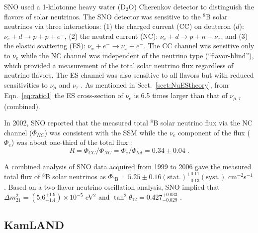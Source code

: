 SNO used a 1-kilotonne heavy water (D$_2$O) Cherenkov detector to distinguish the flavors of solar neutrinos. The SNO detector was sensitive to the $^8$B solar neutrinos via three interactions: (1) the charged current (CC) on deuteron ($d$): $\nu_e+d\to p+p+e^-$, (2) the neutral current (NC): $\nu_x+d\to p+n+\nu_x$, and (3) the elastic scattering (ES): $\nu_x+e^-\to \nu_x+e^-$. The CC channel was sensitive only to $\nu_e$ while the NC channel was independent of the neutrino type (``flavor-blind''), which provided a measurement of the total solar neutrino flux regardless of neutrino flavors. The ES channel was also sensitive to all flavors but with reduced sensitivities to $\nu_\mu$ and $\nu_\tau$ \cite{ahmad2002direct}. As mentioned in Sect.~\ref{sect:NuEStheory}, from Eqn.~\ref{eq:ratio1} the ES cross-section of $\nu_e$ is 6.5 times larger than that of $\nu_{\mu,\tau}$ (combined). 

In 2002, SNO reported that the measured total $^8$B solar neutrino flux via the NC channel ($\Phi_{NC}$) was consistent with the SSM while the $\nu_e$
component of the flux ($\Phi_e$) was about one-third of the total flux \cite{ahmad2002direct}:
\begin{equation}
R = \Phi_{CC}/\Phi_{NC} = \Phi_e/\Phi_{tot}=0.34\pm 0.04 \; .
\end{equation}

A combined analysis of SNO data acquired from 1999 to 2006 gave the measured total flux of $^8$B solar neutrinos as $\Phi_{^8\mathrm{B}}=5.25\pm0.16\mathrm{(stat.)}^{+0.11}_{-0.13}\mathrm{(syst.)}$ cm$^{-2}$s$^{-1}$. Based on a two-flavor neutrino oscillation analysis, SNO implied that $\Delta m^2_{21}=(5.6^{+1.9}_{-1.4})\times 10^{-5}$ eV$^2$ and $\tan^2\theta_{12}=0.427^{+0.033}_{-0.029}$ \cite{aharmim2013combined}.

\subsection{KamLAND}

